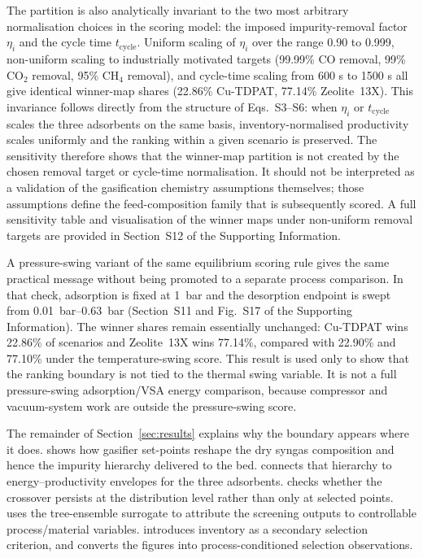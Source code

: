 \documentclass[11pt,a4paper]{article}
\newcommand{\PSA}{pressure-swing adsorption}
\begin{document}
The partition is also analytically invariant to the two most arbitrary
normalisation choices in the scoring model: the imposed impurity-removal factor
$\eta_i$ and the cycle time $t_{\mathrm{cycle}}$. Uniform scaling of $\eta_i$
over the range 0.90 to 0.999, non-uniform scaling to industrially motivated
targets (99.99\% CO removal, 99\% CO$_2$ removal, 95\% CH$_4$ removal), and
cycle-time scaling from 600 s to 1500 s all give identical winner-map shares
(22.86\% Cu-TDPAT, 77.14\% Zeolite~13X). This invariance follows directly from
the structure of Eqs.~S3--S6: when $\eta_i$ or $t_{\mathrm{cycle}}$ scales the
three adsorbents on the same basis, inventory-normalised productivity scales
uniformly and the ranking within a given scenario is preserved. The sensitivity
therefore shows that the winner-map partition is not created by the chosen
removal target or cycle-time normalisation. It should not be interpreted as a
validation of the gasification chemistry assumptions themselves; those
assumptions define the feed-composition family that is subsequently scored. A
full sensitivity table and visualisation of the winner maps under non-uniform
removal targets are provided in Section~S12 of the Supporting Information.

A pressure-swing variant of the same equilibrium scoring rule gives the same
practical message without being promoted to a separate process comparison. In
that check, adsorption is fixed at \SI{1}{bar} and the desorption endpoint is
swept from \SIrange{0.01}{0.63}{bar} (Section~S11 and Fig.~S17 of the
Supporting Information). The winner shares remain essentially unchanged:
Cu-TDPAT wins \num{22.86}\% of scenarios and Zeolite~13X wins \num{77.14}\%,
compared with \num{22.90}\% and \num{77.10}\% under the temperature-swing
score. This result is used only to show that the ranking boundary is not tied
to the thermal swing variable. It is not a full \PSA{}/VSA energy comparison,
because compressor and vacuum-system work are outside the pressure-swing score.

The remainder of Section~\ref{sec:results} explains why the boundary appears
where it does.  shows how gasifier set-points reshape the dry
syngas composition and hence the impurity hierarchy delivered to the bed.
 connects that hierarchy to energy--productivity envelopes
for the three adsorbents.  checks whether the crossover persists
at the distribution level rather than only at selected points. 
uses the tree-ensemble surrogate to attribute the screening outputs to
controllable process/material variables.  introduces inventory
as a secondary selection criterion, and  converts the figures
into process-conditioned selection observations.
\end{document}
